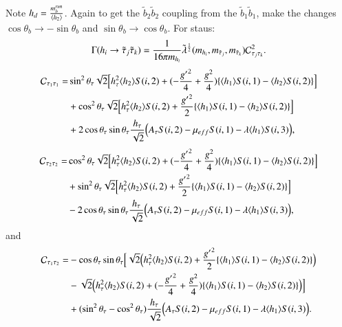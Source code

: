 \documentclass[final,3p,times,pdflatex]{elsarticle}
\begin{document}
Note $h_{d} = {m_{b}^{run} \over \langle h_{2} \rangle}$. Again to get the $\tilde{b}_2 \tilde{b}_2$ coupling from the $\tilde{b}_1 \tilde{b}_1$, make the changes $\cos\theta_b \rightarrow -\sin\theta_b$ and $\sin\theta_b \rightarrow \cos\theta_b$.
For staus:
\begin{equation} \label{hstaustauNMSSM}
\Gamma( h_{i} \rightarrow \tilde{\tau}_{j} \tilde{\tau}_{k} ) = {1 \over 16\pi m_{h_i}} \tilde{\lambda}^{1 \over 2}(m_{{h}_i},m_{\tilde{\tau}_j},m_{\tilde{\tau}_k})\mathcal{C}_{\tau_{j}\tau_{k}}^2.
\end{equation}
\begin{equation}
\begin{aligned}
\mathcal{C}_{\tau_{1}\tau_{1}} = & \sin^2\theta_\tau \sqrt{2}\Big[h_{\tau}^2 \langle h_{2} \rangle S(i,2) + (-{{g'}^{2} \over 4} + {g^2 \over 4})\{\langle h_{1} \rangle S(i,1) - \langle h_{2} \rangle S(i,2)\}\Big] \\ & + \cos^2 \theta_\tau \sqrt{2} \Big[h_{\tau}^2 \langle h_{2} \rangle S(i,2) + {{g'}^2 \over 2}\{\langle h_{1} \rangle S(i,1) - \langle h_{2} \rangle S(i,2)\}\Big] \\ & + 2\cos\theta_\tau \sin\theta_\tau {h_{\tau} \over \sqrt{2}}\Big(A_{\tau} S(i,2) - \mu_{eff} S(i,1) - \lambda \langle h_{1} \rangle S(i,3)\Big),
\end{aligned}
\end{equation}
\begin{equation}
\begin{aligned}
\mathcal{C}_{\tau_{2}\tau_{2}} = & \cos^2\theta_\tau \sqrt{2}\Big[h_{\tau}^2 \langle h_{2} \rangle S(i,2) + (-{{g'}^{2} \over 4} + {g^2 \over 4})\{\langle h_{1} \rangle S(i,1) - \langle h_{2} \rangle S(i,2)\}\Big] \\ & + \sin^2 \theta_\tau \sqrt{2} \Big[h_{\tau}^2 \langle h_{2} \rangle S(i,2) + {{g'}^2 \over 2}\{\langle h_{1} \rangle S(i,1) - \langle h_{2} \rangle S(i,2)\}\Big] \\ & - 2\cos\theta_\tau \sin\theta_\tau {h_{\tau} \over \sqrt{2}}\Big(A_{\tau} S(i,2) - \mu_{eff} S(i,1) - \lambda \langle h_{1} \rangle S(i,3)\Big), 
\end{aligned}
\end{equation}
and 
\begin{equation}
\begin{aligned}
\mathcal{C}_{\tau_{1}\tau_{2}} = & -\cos\theta_\tau \sin\theta_\tau \Big[\sqrt{2} \Big(h_{\tau}^2 \langle h_{2} \rangle S(i,2) + {{g'}^2 \over 2}\{\langle h_{1} \rangle S(i,1) - \langle h_{2} \rangle S(i,2)\}\Big) \\ & - \sqrt{2}\Big(h_{\tau}^2 \langle h_{2} \rangle S(i,2)  + (-{{g'}^2 \over 4} + {g^2 \over 4})\{\langle h_{1} \rangle S(i,1) - \langle h_{2} \rangle S(i,2)\}\Big)\Big] \\ & + (\sin^2 \theta_\tau - \cos^2 \theta_\tau) {h_{\tau} \over \sqrt{2}} \Big(A_{\tau} S(i,2) - \mu_{eff} S(i,1) - \lambda \langle h_{1} \rangle S(i,3)\Big).
\end{aligned}
\end{equation}
\end{document}
